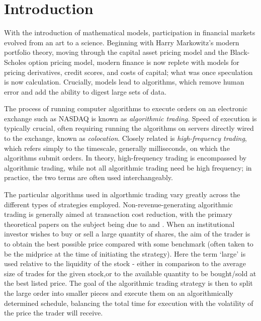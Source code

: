 \chapter{Introduction}

With the introduction of mathematical models, participation in financial markets evolved from an art to a science. Beginning with Harry Markowitz's modern portfolio theory, moving through the capital asset pricing model and the Black-Scholes option pricing model, modern finance is now replete with models for pricing derivatives, credit scores, and costs of capital; what was once speculation is now calculation. Crucially, models lead to algorithms, which remove human error and add the ability to digest large sets of data. 

The process of running computer algorithms to execute orders on an electronic exchange such as NASDAQ is known as \emph{algorithmic trading}. Speed of execution is typically crucial, often requiring running the algorithms on servers directly wired to the exchange, known as \emph{colocation}. Closely related is \emph{high-frequency trading}, which refers simply to the timescale, generally milliseconds, on which the algorithms submit orders. In theory, high-frequency trading is encompassed by algorithmic trading, while not all algorithmic trading need be high frequency; in practice, the two terms are often used interchangeably. 

The particular algorithms used in algorthmic trading vary greatly across the different types of strategies employed. Non-revenue-generating algorithmic trading is generally aimed at transaction cost reduction, with the primary theoretical papers on the subject being due to \citet{Bertsimas98} and \citet{Almgren01}. When an institutional investor wishes to buy or sell a large quantity of shares, the aim of the trader is to obtain the best possible price compared with some benchmark (often taken to be the midprice at the time of initiating the strategy). Here the term `large' is used relative to the liquidity of the stock - either in comparison to the average size of trades for the given stock,or to the available quantity to be bought/sold at the best listed price. The goal of the algorithmic trading strategy is then to split the large order into smaller pieces and execute them on an algorithmically determined schedule, balancing the total time for execution with the volatility of the price the trader will receive. 

